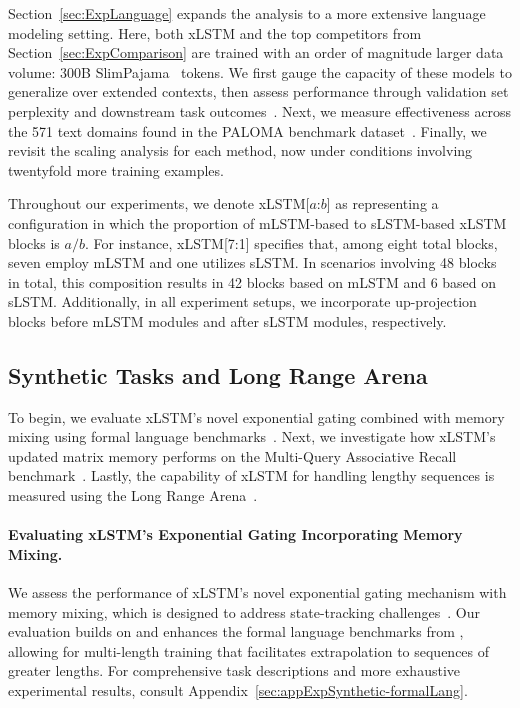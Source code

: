Section~\ref{sec:ExpLanguage} expands the analysis to a more extensive language modeling setting. Here, both xLSTM and the top competitors from Section~\ref{sec:ExpComparison} are trained with an order of magnitude larger data volume: 300B SlimPajama~\citep{Soboleva:23} tokens. We first gauge the capacity of these models to generalize over extended contexts, then assess performance through validation set perplexity and downstream task outcomes~\citep{Sutawika:24}. Next, we measure effectiveness across the 571 text domains found in the PALOMA benchmark dataset~\citep{Magnusson:23arxivshort}. Finally, we revisit the scaling analysis for each method, now under conditions involving twentyfold more training examples.

\label{sec:xlstm_blocks_notation}
Throughout our experiments, we denote xLSTM[$a$:$b$] as representing a configuration in which the proportion of mLSTM-based to sLSTM-based xLSTM blocks is $a/b$. For instance, xLSTM[7:1] specifies that, among eight total blocks, seven employ mLSTM and one utilizes sLSTM. In scenarios involving 48 blocks in total, this composition results in 42 blocks based on mLSTM and 6 based on sLSTM. Additionally, in all experiment setups, we incorporate up-projection blocks before mLSTM modules and after sLSTM modules, respectively.

\subsection{Synthetic Tasks and Long Range Arena}
\label{sec:ExpSyntethic}
To begin, we evaluate xLSTM’s novel exponential gating combined with memory mixing using formal language benchmarks~\citep{Deletang:23}. Next, we investigate how xLSTM’s updated matrix memory performs on the Multi-Query Associative Recall benchmark~\citep{Arora:23arxiv}. Lastly, the capability of xLSTM for handling lengthy sequences is measured using the Long Range Arena~\citep{Tay:21}.

\paragraph{Evaluating xLSTM's Exponential Gating Incorporating Memory Mixing.} We assess the performance of xLSTM's novel exponential gating mechanism with memory mixing, which is designed to address state-tracking challenges~\citep{Merrill:24, Merrill:23}. Our evaluation builds on and enhances the formal language benchmarks from \citet{Deletang:23}, allowing for multi-length training that facilitates extrapolation to sequences of greater lengths. For comprehensive task descriptions and more exhaustive experimental results, consult Appendix~\ref{sec:appExpSynthetic-formalLang}. 

